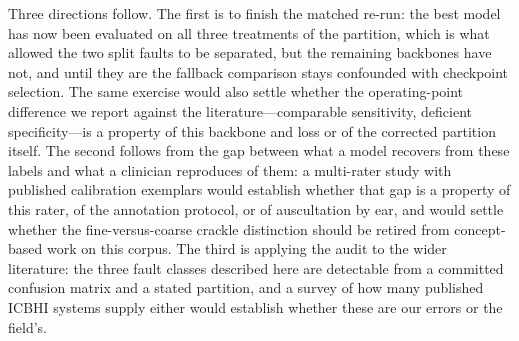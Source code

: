 \documentclass[journal,onecolumn]{IEEEtran}
\begin{document}
Three directions follow. The first is to finish the matched re-run: the best model has
now been evaluated on all three treatments of the partition, which is what allowed the
two split faults to be separated, but the remaining backbones have not, and until they
are the fallback comparison stays confounded with checkpoint selection. The same
exercise would also settle whether the operating-point difference we report against the
literature---comparable sensitivity, deficient specificity---is a property of this
backbone and loss or of the corrected partition itself. The second follows from the gap between what a model recovers from these labels and
what a clinician reproduces of them: a multi-rater study with published calibration
exemplars would establish whether that gap is a property of this rater, of the
annotation protocol, or of auscultation by ear, and would settle whether the
fine-versus-coarse crackle distinction should be retired from concept-based work on this
corpus. The third is applying the audit to the wider literature: the three fault
classes described here are detectable from a committed confusion matrix and a stated
partition, and a survey of how many published ICBHI systems supply either would
establish whether these are our errors or the field's.



\end{document}
